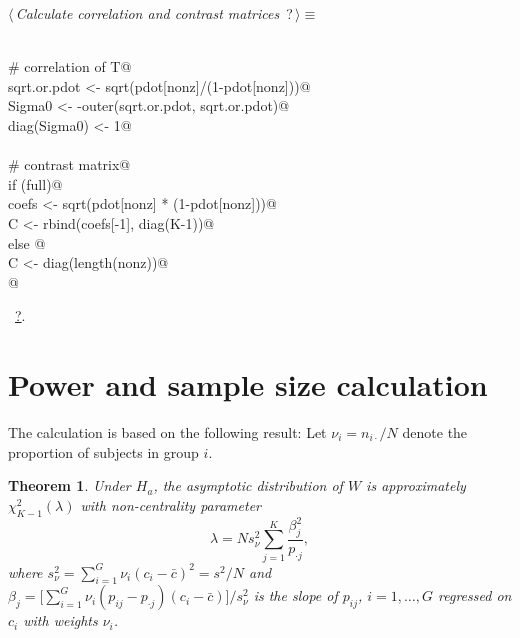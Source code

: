 \documentclass[reqno]{amsart}
\renewcommand{\NWtarget}[2]{\hypertarget{#1}{#2}}
\renewcommand{\NWlink}[2]{\hyperlink{#1}{#2}}
\newtheorem{theorem}{Theorem}
\begin{document}
\begin{flushleft} \small\label{scrap13}\raggedright\small
\NWtarget{nuweb?}{} $\langle\,${\itshape Calculate correlation and contrast matrices}\nobreak\ {\footnotesize {?}}$\,\rangle\equiv$
\vspace{-1ex}
\begin{list}{}{} \item
\mbox{}\verb@@\\
\mbox{}\verb@  # correlation of T@\\
\mbox{}\verb@  sqrt.or.pdot <- sqrt(pdot[nonz]/(1-pdot[nonz]))@\\
\mbox{}\verb@  Sigma0 <- -outer(sqrt.or.pdot, sqrt.or.pdot)@\\
\mbox{}\verb@  diag(Sigma0) <- 1@\\
\mbox{}\verb@@\\
\mbox{}\verb@  # contrast matrix@\\
\mbox{}\verb@  if (full){@\\
\mbox{}\verb@    coefs <- sqrt(pdot[nonz] * (1-pdot[nonz]))@\\
\mbox{}\verb@    C <- rbind(coefs[-1], diag(K-1))@\\
\mbox{}\verb@  } else {@\\
\mbox{}\verb@    C <- diag(length(nonz))@\\
\mbox{}\verb@  }@\\
\mbox{}\verb@@{\NWsep}
\end{list}
\vspace{-1.5ex}
\footnotesize
\begin{list}{}{\setlength{\itemsep}{-\parsep}\setlength{\itemindent}{-\leftmargin}}
\item \NWtxtMacroRefIn\ \NWlink{nuweb?}{?}.

\item{}
\end{list}
\vspace{4ex}
\end{flushleft}
\section{Power and sample size calculation}
The calculation is based on the following result:
Let $\nu_i=n_{i\cdot}/N$ denote the proportion
of subjects in group $i$. 

\begin{theorem}\label{Th:power}
Under $H_a$, the asymptotic distribution of $W$ is approximately $\chi_{K-1}^2(\lambda)$ with non-centrality parameter
\begin{equation}\label{E:ncp}
  \lambda = N  s_\nu^2 \sum_{j=1}^K \frac{\beta_j^2}{p_{\cdot j}},
\end{equation}
where $s_\nu^2= \sum_{i=1}^G \nu_i(c_i-\bar{c})^2=s^2/N$ and $\beta_j=\big[\sum_{i=1}^G \nu_{i}(p_{ij}-p_{\cdot
  j})(c_i-\bar{c})\big] /s_\nu^2$ is the slope of $p_{ij}$, $i=1,\ldots,G$ regressed on $c_i$ with weights $\nu_i$.
\end{theorem}
\end{document}
